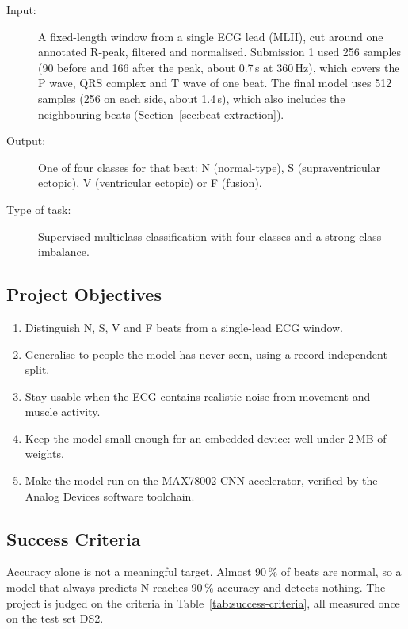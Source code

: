 \begin{description}
  \item[Input:] A fixed-length window from a single ECG lead (MLII), cut around one annotated R-peak, filtered and normalised. Submission 1 used 256 samples (90 before and 166 after the peak, about 0.7\,s at 360\,Hz), which covers the P wave, QRS complex and T wave of one beat. The final model uses 512 samples (256 on each side, about 1.4\,s), which also includes the neighbouring beats (Section~\ref{sec:beat-extraction}).
  \item[Output:] One of four classes for that beat: N (normal-type), S (supraventricular ectopic), V (ventricular ectopic) or F (fusion).
  \item[Type of task:] Supervised multiclass classification with four classes and a strong class imbalance.
\end{description}

\subsection{Project Objectives}

\begin{enumerate}[nosep]
  \item Distinguish N, S, V and F beats from a single-lead ECG window.
  \item Generalise to people the model has never seen, using a record-independent split.
  \item Stay usable when the ECG contains realistic noise from movement and muscle activity.
  \item Keep the model small enough for an embedded device: well under 2\,MB of weights.
  \item Make the model run on the MAX78002 CNN accelerator, verified by the Analog Devices software toolchain.
\end{enumerate}

\subsection{Success Criteria}
\label{sec:success-criteria}

Accuracy alone is not a meaningful target. Almost 90\,\% of beats are normal, so a model that always predicts N reaches 90\,\% accuracy and detects nothing. The project is judged on the criteria in Table~\ref{tab:success-criteria}, all measured once on the test set DS2.

